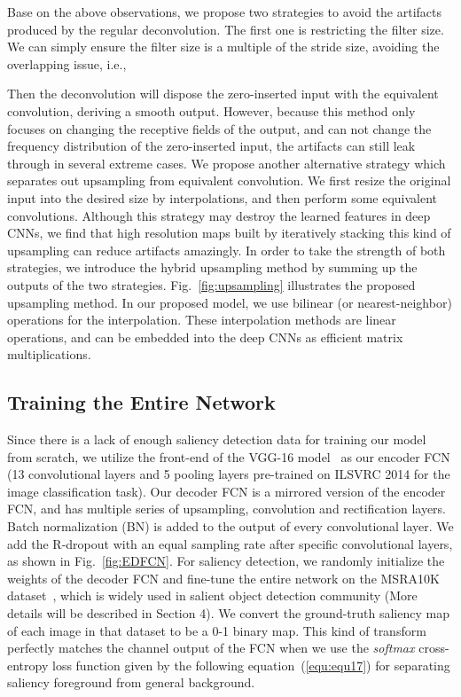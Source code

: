 \documentclass[10pt,twocolumn,letterpaper]{article}
\begin{document}
Base on the above observations, we propose two strategies to avoid the artifacts produced by the regular deconvolution.
The first one is restricting the filter size. We can simply ensure the filter size is a multiple of the stride size, avoiding the overlapping issue, i.e.,

Then the deconvolution will dispose the zero-inserted input with the equivalent convolution, deriving a smooth output.
However, because this method only focuses on changing the receptive fields of the output, and can not change the frequency distribution of the zero-inserted input, the artifacts can still leak through in several extreme cases.
We propose another alternative strategy which separates out upsampling from equivalent convolution.
We first resize the original input into the desired size by interpolations, and then perform some equivalent convolutions.
Although this strategy may destroy the learned features in deep CNNs, we find that high resolution maps built by iteratively stacking this kind of upsampling can reduce artifacts amazingly.
In order to take the strength of both strategies, we introduce the hybrid upsampling method by summing up the outputs of the two strategies.
Fig.~\ref{fig:upsampling} illustrates the proposed upsampling method.
In our proposed model, we use bilinear (or nearest-neighbor) operations for the interpolation.
These interpolation methods are linear operations, and can be embedded into the deep CNNs as efficient matrix multiplications.
\subsection{Training the Entire Network}
Since there is a lack of enough saliency detection data for training our model from scratch, we utilize the front-end of the VGG-16 model~\cite{simonyan2014very} as our encoder FCN (13 convolutional layers and 5 pooling layers pre-trained on ILSVRC 2014 for the image classification task).
Our decoder FCN is a mirrored version of the encoder FCN, and has multiple series of upsampling, convolution
and rectification layers.
Batch normalization (BN) is added to the output of every convolutional layer.
We add the R-dropout with an equal sampling rate  after specific convolutional layers, as shown in Fig.~\ref{fig:EDFCN}.
For saliency detection, we randomly initialize the weights of the decoder FCN and fine-tune the entire network on the MSRA10K dataset~\cite{ChengPAMI}, which is widely used in salient object detection community (More details will be described in Section 4).
We convert the ground-truth saliency map of each image in that dataset to be a 0-1 binary map.
This kind of transform perfectly matches the channel output of the FCN when we use the \emph{softmax} cross-entropy loss function given by the following equation~(\ref{equ:equ17}) for separating saliency foreground from general background.
\end{document}
